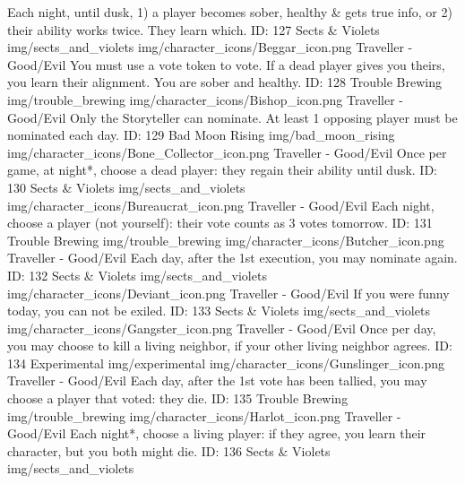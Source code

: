 	{Each night, until dusk, 1) a player becomes sober, healthy \& gets true info, or 2) their ability works twice. They learn which.}        
	{ID: 127}
	{Sects \& Violets}
	{img/sects_and_violets}
	{img/character_icons/Beggar_icon.png}
	{\color{goodcolor}Traveller \color{evilcolor}- Good/Evil}
	{You must use a vote token to vote. If a dead player gives you theirs, you learn their alignment. You are sober and healthy.}        
	{ID: 128}
	{Trouble Brewing}
	{img/trouble_brewing}
	{img/character_icons/Bishop_icon.png}
	{\color{goodcolor}Traveller \color{evilcolor}- Good/Evil}
	{Only the Storyteller can nominate. At least 1 opposing player must be nominated each day.}        
	{ID: 129}
	{Bad Moon Rising}
	{img/bad_moon_rising}
	{img/character_icons/Bone_Collector_icon.png}
	{\color{goodcolor}Traveller \color{evilcolor}- Good/Evil}
	{Once per game, at night*, choose a dead player: they regain their ability until dusk.}        
	{ID: 130}
	{Sects \& Violets}
	{img/sects_and_violets}
	{img/character_icons/Bureaucrat_icon.png}
	{\color{goodcolor}Traveller \color{evilcolor}- Good/Evil}
	{Each night, choose a player (not yourself): their vote counts as 3 votes tomorrow.}        
	{ID: 131}
	{Trouble Brewing}
	{img/trouble_brewing}
	{img/character_icons/Butcher_icon.png}
	{\color{goodcolor}Traveller \color{evilcolor}- Good/Evil}
	{Each day, after the 1st execution, you may nominate again.}        
	{ID: 132}
	{Sects \& Violets}
	{img/sects_and_violets}
	{img/character_icons/Deviant_icon.png}
	{\color{goodcolor}Traveller \color{evilcolor}- Good/Evil}
	{If you were funny today, you can not be exiled.}        
	{ID: 133}
	{Sects \& Violets}
	{img/sects_and_violets}
	{img/character_icons/Gangster_icon.png}
	{\color{goodcolor}Traveller \color{evilcolor}- Good/Evil}
	{Once per day, you may choose to kill a living neighbor, if your other living neighbor agrees.}        
	{ID: 134}
	{Experimental}
	{img/experimental}
	{img/character_icons/Gunslinger_icon.png}
	{\color{goodcolor}Traveller \color{evilcolor}- Good/Evil}
	{Each day, after the 1st vote has been tallied, you may choose a player that voted: they die.}        
	{ID: 135}
	{Trouble Brewing}
	{img/trouble_brewing}
	{img/character_icons/Harlot_icon.png}
	{\color{goodcolor}Traveller \color{evilcolor}- Good/Evil}
	{Each night*, choose a living player: if they agree, you learn their character, but you both might die.}        
	{ID: 136}
	{Sects \& Violets}
	{img/sects_and_violets}
